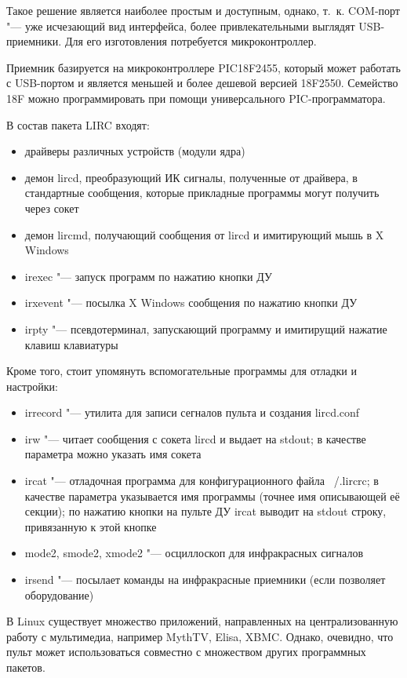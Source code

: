 \documentclass[10pt, a5paper]{article}
\begin{document}
Такое решение является наиболее простым и доступным, однако, т.~к. COM-порт "---
уже исчезающий вид интерфейса, более привлекательными выглядят
USB-приемники. Для его изготовления потребуется микроконтроллер.

Приемник базируется на микроконтроллере PIC18F2455, который может
работать с USB-портом и является меньшей и более дешевой версией
18F2550. Семейство 18F можно программировать при помощи универсального
PIC-программатора.

В состав пакета LIRC входят:
\begin{itemize}
	\item драйверы различных устройств (модули ядра)
	\item демон lircd, преобразующий ИК сигналы, полученные от драйвера, в стандартные сообщения, которые прикладные программы могут получить
через сокет 
\item демон lircmd, получающий сообщения от lircd и имитирующий мышь в X Windows
\item irexec "--- запуск программ по нажатию кнопки ДУ
\item irxevent "--- посылка X Windows сообщения по нажатию кнопки ДУ
\item irpty "--- псевдотерминал, запускающий программу и имитирущий нажатие клавиш клавиатуры
\end{itemize}
Кроме того, стоит упомянуть вспомогательные программы для отладки и настройки:
\begin{itemize}
	\item irrecord "--- утилита для записи сегналов пульта и создания \linebreak lircd.conf
	\item irw "--- читает сообщения с сокета lircd и выдает на stdout; в качестве параметра можно указать имя сокета
	\item ircat "--- отладочная программа для конфигурационного файла ~/.lircrc; в качестве параметра указывается имя программы (точнее имя описывающей
её секции); по нажатию кнопки на пульте ДУ ircat выводит на stdout строку, привязанную к этой кнопке
\item mode2, smode2, xmode2 "--- осциллоскоп для инфракрасных сигналов
\item irsend "--- посылает команды на инфракрасные приемники (если позволяет оборудование)
\end{itemize}
В Linux существует множество приложений, направленных на централизованную работу с мультимедиа, например MythTV, Elisa,
XBMC. Однако, очевидно, что пульт может использоваться совместно с множеством других программных пакетов.
\end{document}
